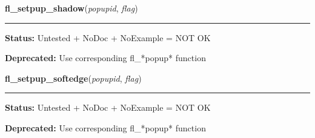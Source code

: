     \label{xformslib:deprecated:fl_setpup_shadow}

    \vspace{0.5ex}

\hspace{.8\funcindent}\begin{boxedminipage}{\funcwidth}

    \raggedright \textbf{fl\_setpup\_shadow}(\textit{popupid}, \textit{flag})

    \vspace{-1.5ex}

    \rule{\textwidth}{0.5\fboxrule}
\setlength{\parskip}{2ex}
\setlength{\parskip}{1ex}
\textbf{Status:} Untested + NoDoc + NoExample = NOT OK



\textbf{Deprecated:} Use corresponding fl\_*popup* function



    \end{boxedminipage}

    \label{xformslib:deprecated:fl_setpup_softedge}

    \vspace{0.5ex}

\hspace{.8\funcindent}\begin{boxedminipage}{\funcwidth}

    \raggedright \textbf{fl\_setpup\_softedge}(\textit{popupid}, \textit{flag})

    \vspace{-1.5ex}

    \rule{\textwidth}{0.5\fboxrule}
\setlength{\parskip}{2ex}
\setlength{\parskip}{1ex}
\textbf{Status:} Untested + NoDoc + NoExample = NOT OK



\textbf{Deprecated:} Use corresponding fl\_*popup* function



    \end{boxedminipage}

    \label{xformslib:deprecated:fl_setpup_bw}

